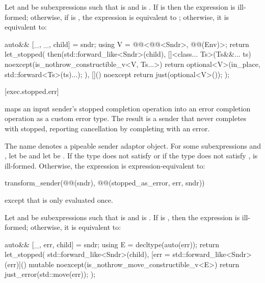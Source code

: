 \pnum
Let  and  be subexpressions
such that  is  and
 is .
If 
is 
then the expression 
is ill-formed;
otherwise,
if 
is ,
the expression 
is equivalent to ;
otherwise, it is equivalent to:
\begin{codeblock}
auto&& [_, _, child] = sndr;
using V = @@<@@<Sndr>, @@(Env)>;
return let_stopped(
  then(std::forward_like<Sndr>(child),
       []<class... Ts>(Ts&&... ts) noexcept(is_nothrow_constructible_v<V, Ts...>) {
         return optional<V>(in_place, std::forward<Ts>(ts)...);
       }),
  []() noexcept { return just(optional<V>()); });
\end{codeblock}

[exec.stopped.err]{}

\pnum
{} maps an input sender's stopped completion operation
into an error completion operation as a custom error type.
The result is a sender that never completes with stopped,
reporting cancellation by completing with an error.

\pnum
The name  denotes a pipeable sender adaptor object.
For some subexpressions  and ,
let  be  and
let  be .
If the type  does not satisfy  or
if the type  does not satisfy ,
 is ill-formed.
Otherwise, the expression 
is expression-equivalent to:
\begin{codeblock}
transform_sender(@@(sndr), @@(stopped_as_error, err, sndr))
\end{codeblock}
except that  is only evaluated once.

\pnum
Let  and  be subexpressions
such that  is  and
 is .
If  is ,
then the expression 
is ill-formed;
otherwise, it is equivalent to:
\begin{codeblock}
auto&& [_, err, child] = sndr;
using E = decltype(auto(err));
return let_stopped(
  std::forward_like<Sndr>(child),
  [err = std::forward_like<Sndr>(err)]() mutable noexcept(is_nothrow_move_constructible_v<E>) {
    return just_error(std::move(err));
  });
\end{codeblock}

